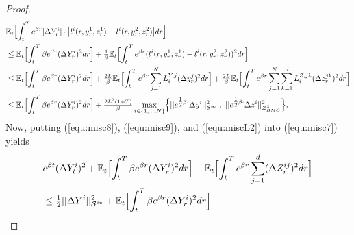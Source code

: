\documentclass[10pt,a4paper]{article}
\theoremstyle{plain}
\theoremstyle{definition}
\numberwithin{equation}{section}
\begin{document}
\begin{proof}
\begin{align}
&\mathbb{E}_{t}\Bigl[\int_{t}^{T}e^{\beta r}|\Delta Y_{r}^{i}|\cdot\bigl|l^{i}(r,y_{r}^{1},z_{r}^{1})-l^{i}(r,y_{r}^{2},z_{r}^{2})\bigr|dr\Bigr] \nonumber \\
&\leq \mathbb{E}_{t}\Bigl[\int_{t}^{T}\beta e^{\beta r}(\Delta Y_{r}^{i})^{2}dr\Bigr] + \tfrac{1}{\beta}\mathbb{E}_{t}\Bigl[\int_{t}^{T}e^{\beta r}(l^{i}(r,y_{r}^{1},z_{r}^{1})-l^{i}(r,y_{r}^{2},z_{r}^{2}))^{2}dr\Bigr] \nonumber \\
&\leq \mathbb{E}_{t}\Bigl[\int_{t}^{T}\beta e^{\beta r}(\Delta Y_{r}^{i})^{2}dr\Bigr] + \tfrac{2L}{\beta}\mathbb{E}_{t}\Bigl[\int_{t}^{T}e^{\beta r}\sum_{j=1}^{N}L_{i}^{Y,j}(\Delta y_{r}^{j})^{2}dr\Bigr] + \tfrac{2L}{\beta}\mathbb{E}_{t}\Bigl[\int_{t}^{T}e^{\beta r}\sum_{j=1}^{N}\sum_{k=1}^{d}L_{i}^{Z,jk}(\Delta z_{r}^{jk})^{2}dr\Bigr] \nonumber \\
&\leq \mathbb{E}_{t}\Bigl[\int_{t}^{T}\beta e^{\beta r}(\Delta Y_{r}^{i})^{2}dr\Bigr] + \tfrac{2L^{2}(1+T)}{\beta}\max_{i \in \{1,...,N\}}\Bigl\{||e^{\tfrac{1}{2}\beta\cdot}\Delta y^{i}||_{\mathcal{S}^{\infty}}^{2} \ , \ ||e^{\tfrac{1}{2}\beta\cdot}\Delta z^{i}||_{\mathcal{Z}_{BMO}^{2}}^{2}\Bigr\}. \label{equ:miscL2}
\end{align}
Now, putting (\ref{equ:misc8}), (\ref{equ:misc9}), and (\ref{equ:miscL2}) into (\ref{equ:misc7}) yields
\begin{align*}
&e^{\beta t}(\Delta Y_{t}^{i})^{2} + \mathbb{E}_{t}\Bigl[\int_{t}^{T}\beta e^{\beta r}(\Delta Y_{r}^{i})^{2}dr\Bigr] + \mathbb{E}_{t}\Bigl[\int_{t}^{T}e^{\beta r}\sum_{j=1}^{d}(\Delta Z_{r}^{ij})^{2}dr\Bigr] \\
&\leq \tfrac{1}{2}||\Delta Y^{i}||_{\mathcal{S}^{\infty}}^{2} + \mathbb{E}_{t}\Bigl[\int_{t}^{T}\beta e^{\beta r}(\Delta Y_{r}^{i})^{2}dr\Bigr] \\

\end{align*}
\end{proof}
\end{document}
